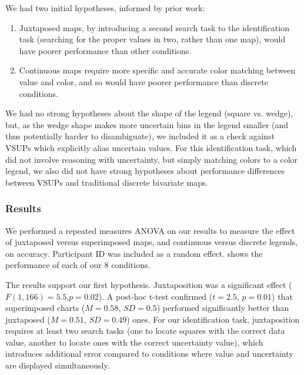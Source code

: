 We had two initial hypotheses, informed by prior work:

\begin{enumerate}
	\item Juxtaposed maps, by introducing a second search task to the identification task (searching for the proper values in two, rather than one map), would have poorer performance than other conditions.
	\item Continuous maps require more specific and accurate color matching between value and color, and so would have poorer performance than discrete conditions.
\end{enumerate}

We had no strong hypotheses about the shape of the legend (square vs. wedge), but, as the wedge shape makes more uncertain bins in the legend smaller (and thus potentially harder to disambiguate), we included it as a check against VSUPs which explicitly alias uncertain values. For this identification task, which did not involve reasoning with uncertainty, but simply matching colors to a color legend, we also did not have strong hypotheses about performance differences between VSUPs and traditional discrete bivariate maps.

\subsubsection{Results}
\taskOneFig

We performed a repeated measures ANOVA on our results to measure the effect of juxtaposed versus superimposed maps, and continuous versus discrete legends, on accuracy. Participant ID was included as a random effect.  shows the performance of each of our 8 conditions.

The results support our first hypothesis. Juxtaposition was a significant effect ($F(1,166)=5.5$,$p=0.02$). A post-hoc t-test confirmed ($t=2.5$, $p=0.01$) that superimposed charts ($M=0.58$, $SD=0.5$) performed significantly better than juxtaposed ($M=0.51$, $SD=0.49$) ones. For our identification task, juxtaposition requires at least two search tasks (one to locate squares with the correct data value, another to locate ones with the correct uncertainty value), which introduces additional error compared to conditions where value and uncertainty are displayed simultaneously. 

